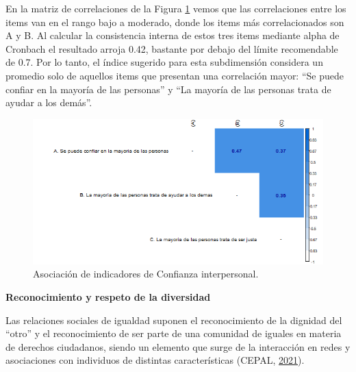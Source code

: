 \documentclass[
  12pt,
]{book}
\begin{document}
En la matriz de correlaciones de la Figura \ref{fig:confianza-interpersonal-cor} vemos que las correlaciones entre los items van en el rango bajo a moderado, donde los items más correlacionados son A y B. Al calcular la consistencia interna de estos tres items mediante alpha de Cronbach el resultado arroja 0.42, bastante por debajo del límite recomendable de 0.7. Por lo tanto, el índice sugerido para esta subdimensión considera un promedio solo de aquellos items que presentan una correlación mayor: ``Se puede confiar en la mayoría de las personas'' y ``La mayoría de las personas trata de ayudar a los demás''.

\begin{figure}[H]

{\centering \includegraphics[width=1\linewidth,height=1\textheight]{output/graphs/confianza-interpersonal_cor} 

}

\caption{Asociación de indicadores de Confianza interpersonal.}\label{fig:confianza-interpersonal-cor}
\end{figure}

\textbf{Reconocimiento y respeto de la diversidad}

Las relaciones sociales de igualdad suponen el reconocimiento de la dignidad del ``otro'' y el reconocimiento de ser parte de una comunidad de iguales en materia de derechos ciudadanos, siendo un elemento que surge de la interacción en redes y asociaciones con individuos de distintas características (CEPAL, \protect\hyperlink{ref-cepal_cohesion_2021}{2021}).
\end{document}
